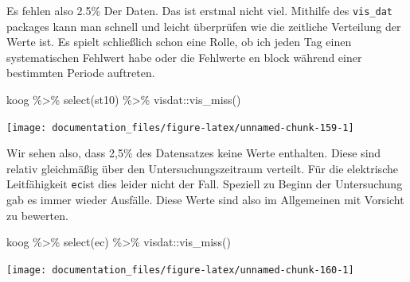 \documentclass[
]{article}
\newenvironment{Shaded}{\begin{snugshade}}{\end{snugshade}}
\newcommand{\DecValTok}[1]{\textcolor[rgb]{0.00,0.00,0.81}{#1}}
\newcommand{\DocumentationTok}[1]{\textcolor[rgb]{0.56,0.35,0.01}{\textbf{\textit{#1}}}}
\newcommand{\FunctionTok}[1]{\textcolor[rgb]{0.00,0.00,0.00}{#1}}
\newcommand{\NormalTok}[1]{#1}
\newcommand{\SpecialCharTok}[1]{\textcolor[rgb]{0.00,0.00,0.00}{#1}}
\begin{document}
\begin{Shaded}
\end{Shaded}

Es fehlen also 2.5\% Der Daten. Das ist erstmal nicht viel. Mithilfe des \texttt{vis\_dat} packages kann man schnell und leicht überprüfen wie die zeitliche Verteilung der Werte ist. Es spielt schließlich schon eine Rolle, ob ich jeden Tag einen systematischen Fehlwert habe oder die Fehlwerte en block während einer bestimmten Periode auftreten.

\begin{Shaded}
\begin{Highlighting}[]
\NormalTok{koog }\SpecialCharTok{\%\textgreater{}\%}
  \FunctionTok{select}\NormalTok{(st10) }\SpecialCharTok{\%\textgreater{}\%}
\NormalTok{  visdat}\SpecialCharTok{::}\FunctionTok{vis\_miss}\NormalTok{()}
\end{Highlighting}
\end{Shaded}

\begin{center}\texttt{[image: documentation\_files/figure-latex/unnamed-chunk-159-1]} \end{center}

Wir sehen also, dass 2,5\% des Datensatzes keine Werte enthalten. Diese sind relativ gleichmäßig über den Untersuchungszeitraum verteilt. Für die elektrische Leitfähigkeit \texttt{ec}ist dies leider nicht der Fall. Speziell zu Beginn der Untersuchung gab es immer wieder Ausfälle. Diese Werte sind also im Allgemeinen mit Vorsicht zu bewerten.

\begin{Shaded}
\begin{Highlighting}[]
\NormalTok{koog }\SpecialCharTok{\%\textgreater{}\%}
  \FunctionTok{select}\NormalTok{(ec) }\SpecialCharTok{\%\textgreater{}\%}
\NormalTok{  visdat}\SpecialCharTok{::}\FunctionTok{vis\_miss}\NormalTok{()}
\end{Highlighting}
\end{Shaded}

\begin{center}\texttt{[image: documentation\_files/figure-latex/unnamed-chunk-160-1]} \end{center}
\end{document}
